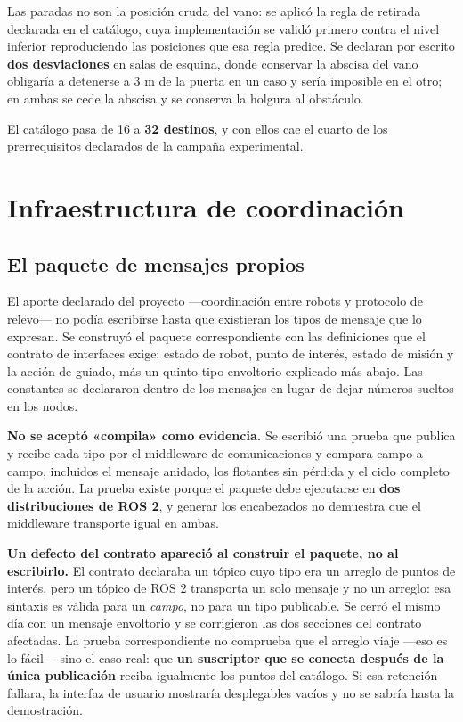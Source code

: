 \documentclass[12pt,letterpaper]{article}
\begin{document}
Las paradas no son la posición cruda del vano: se aplicó la regla de retirada declarada en el catálogo, cuya implementación se validó primero contra el nivel inferior reproduciendo las posiciones que esa regla predice. Se declaran por escrito \textbf{dos desviaciones} en salas de esquina, donde conservar la abscisa del vano obligaría a detenerse a 3 m de la puerta en un caso y sería imposible en el otro; en ambas se cede la abscisa y se conserva la holgura al obstáculo.

El catálogo pasa de 16 a \textbf{32 destinos}, y con ellos cae el cuarto de los prerrequisitos declarados de la campaña experimental.

\section{Infraestructura de coordinación}
\label{sec:coordinacion}

\subsection{El paquete de mensajes propios}

El aporte declarado del proyecto ---coordinación entre robots y protocolo de relevo--- no podía escribirse hasta que existieran los tipos de mensaje que lo expresan. Se construyó el paquete correspondiente con las definiciones que el contrato de interfaces exige: estado de robot, punto de interés, estado de misión y la acción de guiado, más un quinto tipo envoltorio explicado más abajo. Las constantes se declararon dentro de los mensajes en lugar de dejar números sueltos en los nodos.

\textbf{No se aceptó «compila» como evidencia.} Se escribió una prueba que publica y recibe cada tipo por el middleware de comunicaciones y compara campo a campo, incluidos el mensaje anidado, los flotantes sin pérdida y el ciclo completo de la acción. La prueba existe porque el paquete debe ejecutarse en \textbf{dos distribuciones de ROS 2}, y generar los encabezados no demuestra que el middleware transporte igual en ambas.

\textbf{Un defecto del contrato apareció al construir el paquete, no al escribirlo.} El contrato declaraba un tópico cuyo tipo era un arreglo de puntos de interés, pero un tópico de ROS 2 transporta un solo mensaje y no un arreglo: esa sintaxis es válida para un \emph{campo}, no para un tipo publicable. Se cerró el mismo día con un mensaje envoltorio y se corrigieron las dos secciones del contrato afectadas. La prueba correspondiente no comprueba que el arreglo viaje ---eso es lo fácil--- sino el caso real: que \textbf{un suscriptor que se conecta después de la única publicación} reciba igualmente los puntos del catálogo. Si esa retención fallara, la interfaz de usuario mostraría desplegables vacíos y no se sabría hasta la demostración.
\end{document}
